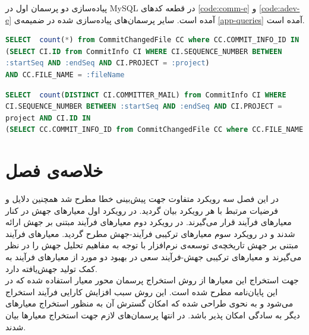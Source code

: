 پیاده‌سازی دو پرسمان اول در MySQL در قطعه‌ کد‌های  \ref{code:comm-e}  و \ref{code:adev-e} آمده است. سایر پرسمان‌های پیاده‌سازی شده در ضمیمه‌ی \ref{app-queries}  آمده است. 

\begin{latin}
\begin{lstlisting}[language=SQL]
SELECT  count(*) from CommitChangedFile CC where CC.COMMIT_INFO_ID IN
(SELECT CI.ID from CommitInfo CI WHERE CI.SEQUENCE_NUMBER BETWEEN 
:startSeq AND :endSeq AND CI.PROJECT = :project)
AND CC.FILE_NAME = :fileName
\end{lstlisting}
\end{latin}
\label{code:comm-e}

\begin{latin}
\begin{lstlisting}[language=SQL]
SELECT  count(DISTINCT CI.COMMITTER_MAIL) from CommitInfo CI WHERE
CI.SEQUENCE_NUMBER BETWEEN :startSeq AND :endSeq AND CI.PROJECT = 
project AND CI.ID IN 
(SELECT CC.COMMIT_INFO_ID from CommitChangedFile CC where CC.FILE_NAME = :fileName)
\end{lstlisting}
\end{latin}
\label{code:adev-e}

\section{خلاصه‌ی فصل}

در این فصل سه رویکرد متفاوت جهت پیش‌بینی خطا مطرح شد همچنین دلایل و فرضیات مرتبط با هر رویکرد بیان گردید. در رویکرد اول معیارهای جهش در کنار معیارهای فرآیند قرار می‌گیرند. در رویکرد دوم معیارهای فرآیند مبتنی بر جهش ارائه شدند و در رویکرد سوم معیارهای ترکیبی فرآیند-جهش مطرح گردید. معیارهای فرآیند مبتنی بر جهش تاریخچه‌ی توسعه‌ی نرم‌افزار با توجه به مفاهیم تحلیل جهش  را در نظر می‌گیرند و معیارهای ترکیبی جهش-فرآیند سعی در بهبود دو مورد از  معیارهای فرآیند به کمک تولید جهش‌یافته دارد. \\
جهت استخراج این معیارها  از روش استخراج پرسمان محور معیار استفاده شده که در این پایان‌نامه مطرح شده است. این روش سبب افزایش کارایی فرآیند استخراج می‌شود و به نحوی طراحی شده که امکان گسترش آن به منظور استخراج معیارهای دیگر به سادگی امکان پذیر باشد. در انتها پرسمان‌های لازم جهت استخراج معیارها بیان شدند.





